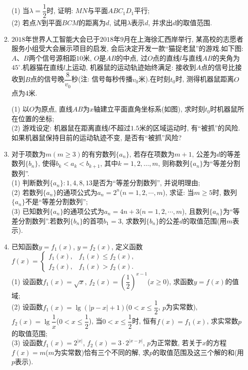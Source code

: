 \documentclass[10pt,a4paper]{article}
\begin{document}
\begin{enumerate}[1.]
(1) 当$\lambda =\dfrac{1}{2}$时, 证明: $MN$与平面$ABC_1D_1$平行;\\
(2) 若点$N$到平面$BCM$的距离为$d$, 试用$\lambda$表示$d$, 并求出$d$的取值范围.
\item $2018$年世界人工智能大会已于$2018$年$9$月在上海徐汇西岸举行, 某高校的志愿者服务小组受大会展示项目的启发, 会后决定开发一款``猫捉老鼠''的游戏.如下图: $A$、$B$两个信号源相距$10$米, $O$是$AB$的中点, 过$O$点的直线$l$与直线$AB$的夹角为$45^\circ$.机器猫在直线$l$上运动, 机器鼠的运动轨迹始终满足: 接收到$A$点的信号比接收到$B$点的信号晚$\dfrac 8{v_0}$秒(注: 信号每秒传播$v_0$米).在时刻$t_0$时, 测得机器鼠距离$O$点为$4$米.
\begin{center}
\end{center}
(1) 以$O$为原点, 直线$AB$为$x$轴建立平面直角坐标系(如图), 求时刻$t_0$时机器鼠所在位置的坐标;\\
(2) 游戏设定: 机器鼠在距离直线$l$不超过$1.5$米的区域运动时, 有``被抓''的风险.如果机器鼠保持目前的运动轨迹不变, 是否有``被抓''风险?
\item 对于项数为$m(m\ge 3)$的有穷数列$\{a_n\}$, 若存在项数为$m+1$, 公差为$d$的等差数列$\{b_n\}$, 使得$b_k<a_k<b_{k+1}$, 其中$k=1,2,\ldots ,m$, 则称数列$\{a_n\}$为``等差分割数列''.\\
(1) 判断数列$\{a_n\}:1,4,8,13$是否为``等差分割数列'', 并说明理由;\\
(2) 若数列$\{a_n\}$的通项公式为$a_n=2^n$($n=1,2,\cdots ,m$), 求证: 当$m\ge 5$时, 数列$\{a_n\}$不是``等差分割数列'';\\
(3) 已知数列$\{a_n\}$的通项公式为$a_n=4n+3$($n=1,2,\cdots ,m$), 且数列$\{a_n\}$为``等差分割数列''.若数列$\{b_n\}$的首项$b_1=3$, 求数列$\{b_n\}$的公差$d$的取值范围(用$m$表示).
\item 已知函数$y=f_1(x)$, $y=f_2(x)$, 定义函数$f(x)=\begin{cases} f_1(x), & f_1(x)\le f_2(x), \\ f_2(x), & f_1(x)>f_2(x). \end{cases}$\\
(1) 设函数$f_1(x)=\sqrt x$, $f_2(x)=(\dfrac 12)^{x-1}$($x\ge 0$), 求函数$y=f(x)$的值域;\\
(2) 设函数$f_1(x)=\lg (|p-x|+1)$($0<x\le \dfrac 12$, $p$为实常数), $f_2(x)=\lg \dfrac 1x$($0<x\le \dfrac 12$), 当$0<x\le \dfrac 12$时, 恒有$f(x)=f_1(x)$, 求实常数$p$的取值范围;\\
(3) 设函数$f_1(x)=2^{|x|}$, $f_2(x)=3\cdot 2^{|x-p|}$, $p$为正常数, 若关于$x$的方程$f(x)=m$($m$为实常数)恰有三个不同的解, 求$p$的取值范围及这三个解的和(用$p$表示).


\end{enumerate}
\end{document}
